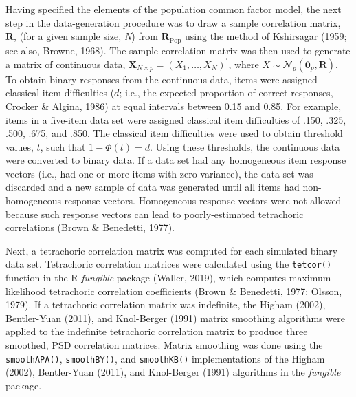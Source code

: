 \documentclass[
  english,
  man]{apa6}
\begin{document}
Having specified the elements of the population common factor model, the next step in the data-generation procedure was to draw a sample correlation matrix, \(\mathbf{R}\), (for a given sample size, \emph{N}) from \(\mathbf{R}_{\textrm{Pop}}\) using the method of Kshirsagar (1959; see also, Browne, 1968). The sample correlation matrix was then used to generate a matrix of continuous data, \(\mathbf{X}_{N \times p} = (X_1, \dots, X_N)^\prime\), where \(X \sim \mathcal{N}_p(\mathbf{0}_p, \mathbf{R})\). To obtain binary responses from the continuous data, items were assigned classical item difficulties (\(d\); i.e., the expected proportion of correct responses, Crocker \& Algina, 1986) at equal intervals between 0.15 and 0.85. For example, items in a five-item data set were assigned classical item difficulties of .150, .325, .500, .675, and .850. The classical item difficulties were used to obtain threshold values, \(t\), such that \(1 - \Phi(t) = d\). Using these thresholds, the continuous data were converted to binary data. If a data set had any homogeneous item response vectors (i.e., had one or more items with zero variance), the data set was discarded and a new sample of data was generated until all items had non-homogeneous response vectors. Homogeneous response vectors were not allowed because such response vectors can lead to poorly-estimated tetrachoric correlations (Brown \& Benedetti, 1977).

Next, a tetrachoric correlation matrix was computed for each simulated binary data set. Tetrachoric correlation matrices were calculated using the \texttt{tetcor()} function in the R \emph{fungible} package (Waller, 2019), which computes maximum likelihood tetrachoric correlation coefficients (Brown \& Benedetti, 1977; Olsson, 1979). If a tetrachoric correlation matrix was indefinite, the Higham (2002), Bentler-Yuan (2011), and Knol-Berger (1991) matrix smoothing algorithms were applied to the indefinite tetrachoric correlation matrix to produce three smoothed, PSD correlation matrices. Matrix smoothing was done using the \texttt{smoothAPA()}, \texttt{smoothBY()}, and \texttt{smoothKB()} implementations of the Higham (2002), Bentler-Yuan (2011), and Knol-Berger (1991) algorithms in the \emph{fungible} package.
\end{document}
